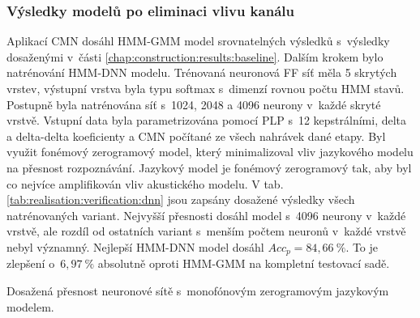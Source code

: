 \subsubsection{Výsledky modelů po eliminaci vlivu kanálu}

Aplikací CMN dosáhl HMM-GMM model srovnatelných výsledků s~výsledky dosaženými v~části \ref{chap:construction:results:baseline}.
Dalším krokem bylo natrénování HMM-DNN modelu.
Trénovaná neuronová FF síť měla 5 skrytých vrstev, výstupní vrstva byla typu softmax s~dimenzí rovnou počtu HMM stavů.
Postupně byla natrénována síť s~1024, 2048 a 4096 neurony v~každé skryté vrstvě.
Vstupní data byla parametrizována pomocí PLP s~12 kepstrálními, delta a delta-delta koeficienty a CMN počítané ze všech nahrávek dané etapy.
Byl využit fonémový zerogramový model, který minimalizoval vliv jazykového modelu na přesnost rozpoznávání.
Jazykový model je fonémový zerogramový tak, aby byl co nejvíce amplifikován vliv akustického modelu.
V tab. \ref{tab:realisation:verification:dnn} jsou zapsány dosažené výsledky všech natrénovaných variant.
Nejvyšší přesnosti dosáhl model s~4096 neurony v~každé vrstvě, ale rozdíl od ostatních variant s~menším počtem neuronů v~každé vrstvě nebyl významný.
Nejlepší HMM-DNN model dosáhl $Acc_{p} = 84,66\ \%$.
To je zlepšení o~$6,97\ \%$ absolutně oproti HMM-GMM na kompletní testovací sadě.

\begin{table}[htpb]
  \centering
  \def\arraystretch{1.5}
  \caption[Přesnost neuronové sítě s~monofónovým zerogramovým LM.]{Dosažená přesnost neuronové sítě s~monofónovým zerogramovým jazykovým modelem.}
  \label{tab:realisation:verification:dnn}
\end{table}
